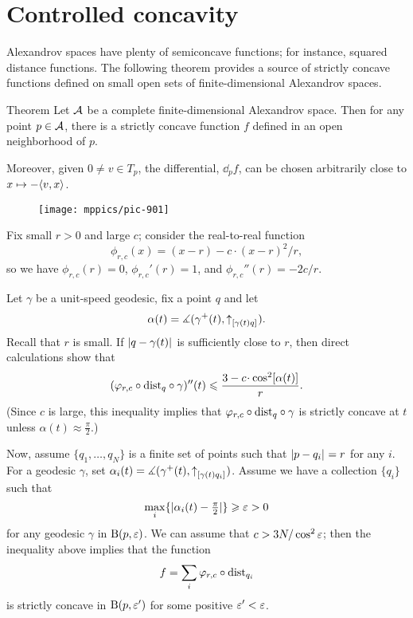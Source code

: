 \section{Controlled concavity}

Alexandrov spaces have plenty of semiconcave functions;
for instance, squared distance functions. 
The following theorem provides a source of strictly concave functions  defined on small open sets of finite-dimensional Alexandrov spaces. 

\begin{thm}{Theorem}
\label{thm:strictly-concave}
Let $\mathcal{A}$ be a complete finite-dimensional Alexandrov  space.
Then for any point $p\in \mathcal{A}$, there is  a strictly concave function $f$ defined in an
open neighborhood of $p$.

Moreover, given $0\ne v\in T_p$, the differential, $\dd_p f$, can be chosen
arbitrarily close to $x\mapsto -\langle v,x\rangle$.
\end{thm}

\begin{wrapfigure}{o}{44 mm}
\vskip-0mm
\centering
\texttt{[image: mppics/pic-901]}
\vskip1mm
\end{wrapfigure}

Fix small $r>0$ and large $c$;
consider the real-to-real function 
$$\phi_{r,c}(x)=(x-r)- c\cdot(x-r)^2/r,$$
so we have 
$\phi_{r,c}(r)=0$,
$\phi_{r,c}'(r)=1$,
and $\phi_{r,c}''(r)=- {2c}/{r}$. 

Let $\gamma$ be a unit-speed geodesic, fix a point $q$ and let 
$$\alpha(t)=\measuredangle(\gamma^+(t),{\uparrow}_{[{\gamma(t)}{q}]_{{}}}).$$
Recall that $r$ is small.
If $|{q}-{\gamma(t)}|_{}^{{}}$ is sufficiently close to
$r$, then direct calculations show that
$$(\phi_{r,c}\circ\distfun_q\circ\gamma)''(t)
\le 
\frac{3-c\cdot \cos^2[\alpha(t)]}{r}.$$
(Since $c$ is large, this inequality implies that $\varphi_{r,c}\circ\mathrm{dist}_q\circ\gamma$ is strictly concave at $t$ unless $\alpha(t)\approx\tfrac\pi2$.) 

Now, assume $\{q_1,\dots, q_N\}$ is a finite set of points such that $|{p}-{q_i}|_{}^{{}}=r$ for any $i$. 
For a geodesic $\gamma$, set $\alpha_i(t)=\measuredangle(\gamma^+(t),{\uparrow}_{[{\gamma(t)}{q_i}]_{{}}})$. 
Assume we have a collection $\{q_i\}$ such
that 
\[\max_i\{|\alpha_i(t)-\tfrac\pi2|\}\geqslant\varepsilon>0\]
for any geodesic $\gamma$ in $\mathrm{B}{}(p,\varepsilon)$. 
We can assume that $c>3N/\cos^2\varepsilon$;
then the inequality above implies that the function
$$f=\sum_i \varphi_{r,c}\circ\mathrm{dist}_{q_i}$$
is strictly concave in $\mathrm{B}{}(p,\varepsilon')$ for some positive $\varepsilon'<\varepsilon$.

